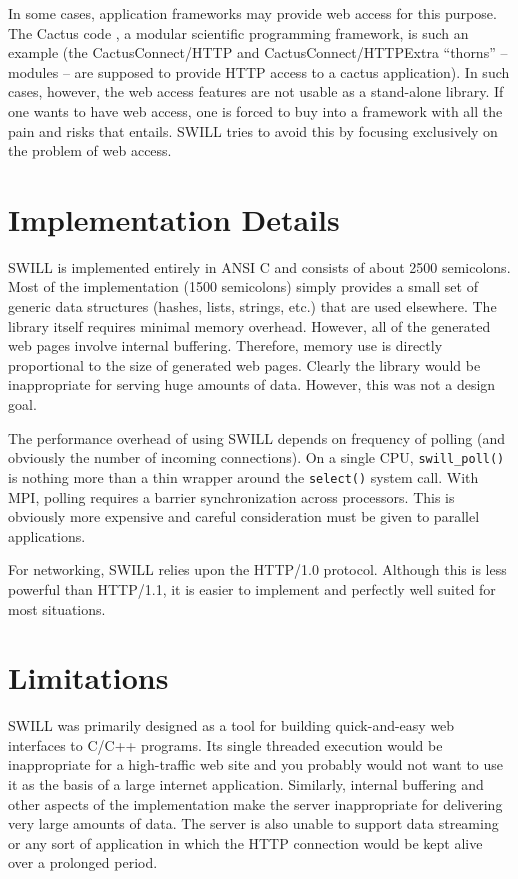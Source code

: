 In some cases, application frameworks
may provide web access for this purpose. The Cactus code \cite{cactus, 
cactuspaper}, a modular scientific programming framework,  is 
such an example (the CactusConnect/HTTP and CactusConnect/HTTPExtra ``thorns'' -- modules -- 
 are supposed to provide HTTP access to a cactus application).  In such cases, 
however, the web
access features are not usable as a stand-alone library. If one wants to have 
web access, one is forced to buy into a framework with all the pain and risks 
that entails. SWILL tries to avoid this by focusing
exclusively on the problem of web access.

\section{Implementation Details}

SWILL is implemented entirely in ANSI C and consists of about 2500
semicolons.  Most of the implementation (1500 semicolons) simply provides a small set of
generic data structures (hashes, lists, strings, etc.) that are used elsewhere.
The library itself requires minimal memory overhead.
However, all of the generated web pages involve internal buffering.
Therefore, memory use is directly proportional to the size of
generated web pages.  Clearly the library would be inappropriate for
serving huge amounts of data.  However, this was not a design goal.

The performance overhead of using SWILL depends on frequency of
polling (and obviously the number of incoming connections).  On a
single CPU, {\tt swill\_poll()} is nothing more than a thin wrapper
around the {\tt select()} system call.  With MPI, polling requires a
barrier synchronization across processors.  This is obviously more
expensive and careful consideration must be given to parallel
applications.

For networking, SWILL relies upon the HTTP/1.0 protocol.  Although this is
less powerful than HTTP/1.1, it is easier to implement and perfectly
well suited for most situations.

\section{Limitations}

SWILL was primarily designed as a tool for building quick-and-easy web
interfaces to C/C++ programs.  Its single threaded execution would be
inappropriate for a high-traffic web site and you probably would not
want to use it as the basis of a large internet application.
Similarly, internal buffering and other aspects of the implementation
make the server inappropriate for delivering very large amounts of
data.  The server is also unable to support data streaming or any sort
of application in which the HTTP connection would be kept alive over a
prolonged period.

